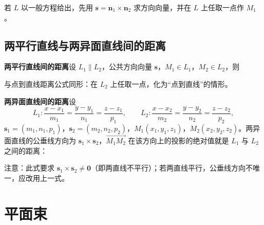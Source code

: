 
若 $L$ 以一般方程给出，先用 $\boldsymbol{s}=\boldsymbol{n}_1\times\boldsymbol{n}_2$ 求方向向量，并在 $L$ 上任取一点作 $M_1$。

\subsection{两平行直线与两异面直线间的距离}

\textbf{两平行直线间的距离}\quad 设 $L_1\parallel L_2$，公共方向向量 $\boldsymbol{s}$，$M_1\in L_1$，$M_2\in L_2$，则


与点到直线距离公式同形：在 $L_2$ 上任取一点，化为“点到直线”的情形。

\textbf{两异面直线间的距离}\quad 设
\[
L_1:\frac{x-x_1}{m_1}=\frac{y-y_1}{n_1}=\frac{z-z_1}{p_1},\qquad
L_2:\frac{x-x_2}{m_2}=\frac{y-y_2}{n_2}=\frac{z-z_2}{p_2},
\]
$\boldsymbol{s}_1=(m_1,n_1,p_1)$，$\boldsymbol{s}_2=(m_2,n_2,p_2)$，$M_1(x_1,y_1,z_1)$，$M_2(x_2,y_2,z_2)$。两异面直线的公垂线方向为 $\boldsymbol{s}_1\times\boldsymbol{s}_2$，$\overrightarrow{M_1M_2}$ 在该方向上的投影的绝对值就是 $L_1$ 与 $L_2$ 之间的距离：


注意：此式要求 $\boldsymbol{s}_1\times\boldsymbol{s}_2\neq\boldsymbol{0}$（即两直线不平行）；若两直线平行，公垂线方向不唯一，应改用上一式。


\section{平面束}


